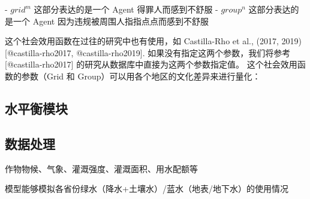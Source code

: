 - $grid^m$ 这部分表达的是一个 Agent 得罪人而感到不舒服
- $group^n$ 这部分表达的是一个 Agent 因为违规被周围人指指点点而感到不舒服

这个社会效用函数在过往的研究中也有使用，如 Castilla-Rho et al., (2017, 2019) [@castilla-rho2017, @castilla-rho2019]. 如果没有指定这两个参数，我们将参考 [@castilla-rho2017] 的研究从数据库中直接为这两个参数指定值。
这个社会效用函数的参数（Grid 和 Group）可以用各个地区的文化差异来进行量化：


\subsection{水平衡模块}

\subsection{数据处理}

作物物候、气象、灌溉强度、灌溉面积、用水配额等

模型能够模拟各省份绿水（降水+土壤水）/蓝水（地表/地下水）的使用情况
